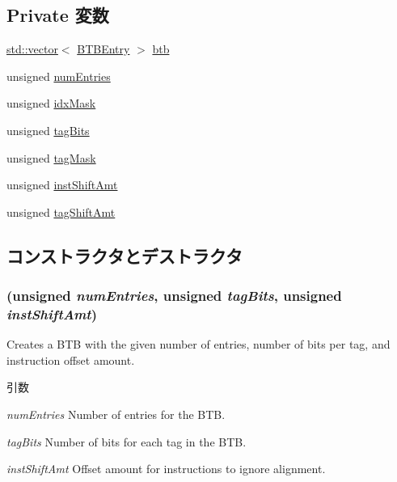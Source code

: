 \subsection*{Private 変数}
\begin{DoxyCompactItemize}
\item 
\hyperlink{classstd_1_1vector}{std::vector}$<$ \hyperlink{structDefaultBTB_1_1BTBEntry}{BTBEntry} $>$ \hyperlink{classDefaultBTB_a8c05f4b6036b078da2303da4defcae7b}{btb}
\item 
unsigned \hyperlink{classDefaultBTB_a325de474a9f6652329339d9fc2ea09c0}{numEntries}
\item 
unsigned \hyperlink{classDefaultBTB_ad0d7752cbf4c876b1ef43c8a15509beb}{idxMask}
\item 
unsigned \hyperlink{classDefaultBTB_a451757836c6c786aee898c2af4a278ae}{tagBits}
\item 
unsigned \hyperlink{classDefaultBTB_a94589d3da2ffd10f97c00aab77a3a7cb}{tagMask}
\item 
unsigned \hyperlink{classDefaultBTB_a8ad2ee60a6143561753205840ad144e7}{instShiftAmt}
\item 
unsigned \hyperlink{classDefaultBTB_a44f1c7028775ed7ca93312fd8ec04f22}{tagShiftAmt}
\end{DoxyCompactItemize}


\subsection{コンストラクタとデストラクタ}
\hypertarget{classDefaultBTB_aa68341d7ac8d111892e8d8060e65000c}{
\subsubsection[{DefaultBTB}]{ (unsigned {\em numEntries}, \/  unsigned {\em tagBits}, \/  unsigned {\em instShiftAmt})}}
\label{classDefaultBTB_aa68341d7ac8d111892e8d8060e65000c}
Creates a BTB with the given number of entries, number of bits per tag, and instruction offset amount. 
\begin{DoxyParams}{引数}
\item[{\em numEntries}]Number of entries for the BTB. \item[{\em tagBits}]Number of bits for each tag in the BTB. \item[{\em instShiftAmt}]Offset amount for instructions to ignore alignment. \end{DoxyParams}



